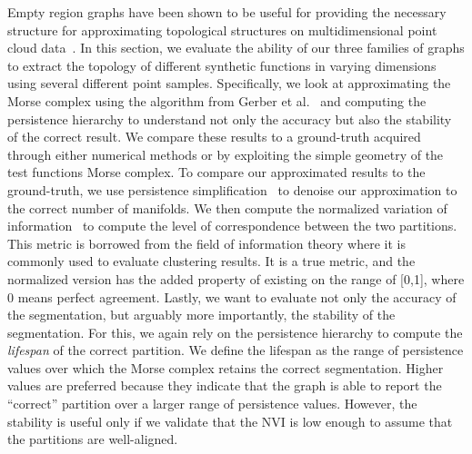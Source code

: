 Empty region graphs have been shown to be useful for providing the necessary structure for approximating topological structures on multidimensional point cloud data~\cite{BremerMaljovecSaha2014,CorreaLindstrom2011,LiebmannWeberScheuermann2018,MaljovecLiuWang2016,MaljovecWangRosen2016}.
%
In this section, we evaluate the ability of our three families of graphs to extract the topology of different synthetic functions in varying dimensions using several different point samples.
%
Specifically, we look at approximating the Morse complex using the algorithm from Gerber et al.~\cite{GerberBremerPascucci2010} and computing the persistence hierarchy to understand not only the accuracy but also the stability of the correct result.
%
We compare these results to a ground-truth acquired through either numerical methods or by exploiting the simple geometry of the test functions Morse complex.
%
To compare our approximated results to the ground-truth, we use persistence simplification~\cite{EdelsbrunnerLetscherZomorodian2002,EdelsbrunnerHarer2008} to denoise our approximation to the correct number of manifolds.
%
We then compute the normalized variation of information~\cite{VinhEppsBailey2010} to compute the level of correspondence between the two partitions.
%
This metric is borrowed from the field of information theory where it is commonly used to evaluate clustering results.
%
It is a true metric, and the normalized version has the added property of existing on the range of [0,1], where 0 means perfect agreement.
%
Lastly, we want to evaluate not only the accuracy of the segmentation, but arguably more importantly, the stability of the segmentation.
%
For this, we again rely on the persistence hierarchy to compute the \textit{lifespan} of the correct partition.
%
We define the lifespan as the range of persistence values over which the Morse complex retains the correct segmentation.
%
Higher values are preferred because they indicate that the graph is able to report the ``correct'' partition over a larger range of persistence values.
%
However, the stability is useful only if we validate that the NVI is low enough to assume that the partitions are well-aligned.


